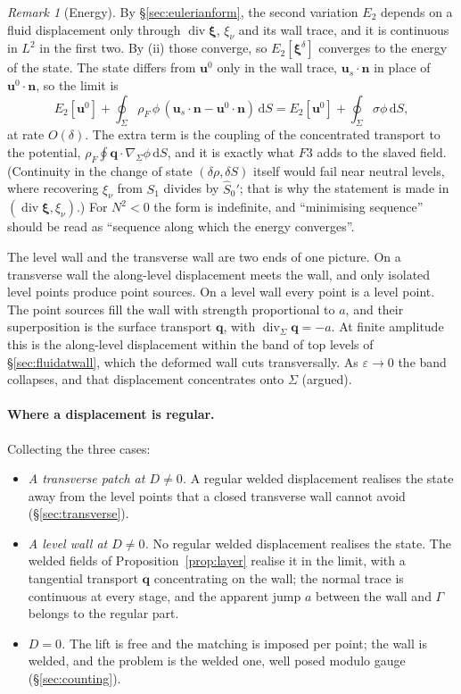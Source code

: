 \documentclass[11pt]{article}
\theoremstyle{definition}
\theoremstyle{remark}
\newtheorem{remark}{Remark}
\newcommand{\bu}{\mathbf{u}}
\newcommand{\bn}{\mathbf{n}}
\newcommand{\bq}{\mathbf{q}}
\newcommand{\bxi}{\boldsymbol{\xi}}
\newcommand{\dS}{\,\mathrm{d}S}
\newcommand{\Div}{\operatorname{div}}
\newcommand{\divS}{\operatorname{div}_\Sigma}
\newcommand{\gradS}{\nabla_\Sigma}
\begin{document}
\begin{remark}[Energy]
\label{rem:energy}
By \S\ref{sec:eulerianform}, the second variation $E_2$ depends on a
fluid displacement only through $\Div\bxi$, $\xi_\nu$ and its wall
trace, and it is continuous in $L^2$ in the first two. By (ii) those
converge, so $E_2[\bxi^\delta]$ converges to the energy of the state.
The state differs from $\bu^0$ only in the wall trace, $\bu_s\cdot\bn$
in place of $\bu^0\cdot\bn$, so the limit is
\begin{equation*}
  E_2[\bu^0] + \oint_\Sigma\rho_F\,\phi\,(\bu_s\cdot\bn - \bu^0\cdot\bn)\dS
  = E_2[\bu^0] + \oint_\Sigma\sigma\phi\dS ,
\end{equation*}
at rate $O(\delta)$. The extra term is the coupling of the concentrated
transport to the potential, $\rho_F\oint\bq\cdot\gradS\phi\dS$, and it
is exactly what $F3$ adds to the slaved field. (Continuity in the
change of state $(\delta\rho, \delta S)$ itself would fail near neutral
levels, where recovering $\xi_\nu$ from $S_1$ divides by $\hat S_0'$;
that is why the statement is made in $(\Div\bxi, \xi_\nu)$.) For $N^2 <
0$ the form is indefinite, and ``minimising sequence'' should be read
as ``sequence along which the energy converges''.
\end{remark}

The level wall and the transverse wall are two ends of one picture. On
a transverse wall the along-level displacement meets the wall, and
only isolated level points produce point sources. On a level wall
every point is a level point. The point sources fill the wall with
strength proportional to $a$, and their superposition is the surface
transport $\bq$, with $\divS\bq = -a$. At finite amplitude this is the
along-level displacement within the band of top levels of
\S\ref{sec:fluidatwall}, which the deformed wall cuts transversally. As
$\varepsilon \to 0$ the band collapses, and that displacement
concentrates onto $\Sigma$ (argued).

\paragraph{Where a displacement is regular.} Collecting the three
cases:
\begin{itemize}
\item \emph{A transverse patch at $D \ne 0$.} A regular welded
  displacement realises the state away from the level points that a
  closed transverse wall cannot avoid (\S\ref{sec:transverse}).
\item \emph{A level wall at $D \ne 0$.} No regular welded displacement
  realises the state. The welded fields of Proposition~\ref{prop:layer}
  realise it in the limit, with a tangential transport $\bq$
  concentrating on the wall; the normal trace is continuous at every
  stage, and the apparent jump $a$ between the wall and $\Gamma$ belongs
  to the regular part.
\item \emph{$D = 0$.} The lift is free and the matching is imposed per
  point; the wall is welded, and the problem is the welded one, well
  posed modulo gauge (\S\ref{sec:counting}).
\end{itemize}
\end{document}
